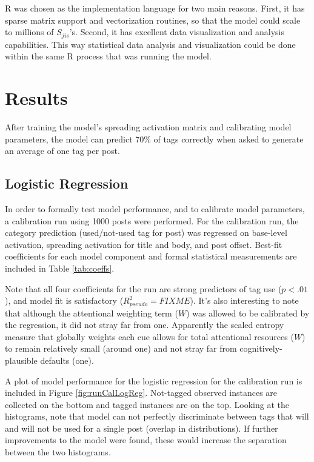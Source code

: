 \documentclass[10pt,letterpaper]{article}
\begin{document}
R was chosen as the implementation language for two main reasons.
First, it has sparse matrix support and vectorization routines, so that the model could scale to millions of $S_{jis}$'s.
Second, it has excellent data visualization and analysis capabilities. 
This way statistical data analysis and visualization could be done within the same R process that was running the model. 

\section{Results}

After training the model's spreading activation matrix and calibrating model parameters, the model can predict 70\% of tags correctly when asked to generate an average of one tag per post.

\subsection{Logistic Regression}

In order to formally test model performance, and to calibrate model parameters, a calibration run using \num{1000} posts were performed.
For the calibration run, the category prediction (used/not-used tag for post) was regressed on base-level activation, spreading activation for title and body, and post offset.
Best-fit coefficients for each model component and formal statistical measurements are included in Table \ref{tab:coeffs}.

Note that all four coefficients for the run are strong predictors of tag use ($p<.01$), and model fit is satisfactory ($R_{pseudo}^{2}=FIXME$).
It's also interesting to note that although the attentional weighting term ($W$) was allowed to be calibrated by the regression, it did not stray far from one.
Apparently the scaled entropy measure that globally weights each cue allows for total attentional resources ($W$) to remain relatively small (around one) and not stray far from cognitively-plausible defaults (one).

A plot of model performance for the logistic regression for the calibration run is included in Figure \ref{fig:runCalLogReg}.
Not-tagged observed instances are collected on the bottom and tagged instances are on the top.
Looking at the histograms, note that model can not perfectly discriminate between tags that will and will not be used for a single post (overlap in distributions).
If further improvements to the model were found, these would increase the separation between the two histograms.
\end{document}

